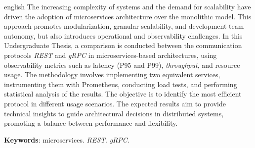\begin{resumo}[Abstract]
	\SingleSpacing
	\begin{otherlanguage*}{english}
		The increasing complexity of systems and the demand for scalability have driven the adoption of microservices architecture over the monolithic model. This approach promotes modularization, granular scalability, and development team autonomy, but also introduces operational and observability challenges. In this Undergraduate Thesis, a comparison is conducted between the communication protocols \textit{REST} and \textit{gRPC} in microservices-based architectures, using observability metrics such as latency (P95 and P99),  \textit{throughput}, and resource usage. The methodology involves implementing two equivalent services, instrumenting them with Prometheus, conducting load tests, and performing statistical analysis of the results. The objective is to identify the most efficient protocol in different usage scenarios. The expected results aim to provide technical insights to guide architectural decisions in distributed systems, promoting a balance between performance and flexibility.
		
		\textbf{Keywords}: microservices. \textit{REST}. \textit{gRPC}.
	\end{otherlanguage*}
\end{resumo}